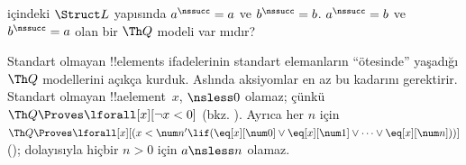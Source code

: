 \documentclass[../../../include/open-logic-section]{subfiles}
\begin{document}
\begin{prob}
 içindeki $\Struct L$ yapısında
$a^\nssucc=a$ ve $b^\nssucc=b$. $a^\nssucc=b$ ve $b^\nssucc=a$ olan
bir $\Th Q$ modeli var mıdır?
\end{prob}

\begin{explain}
Standart olmayan !!{element}s ifadelerinin standart elemanların
``ötesinde'' yaşadığı $\Th Q$ modellerini açıkça kurduk. Aslında
aksiyomlar en az bu kadarını gerektirir. Standart olmayan
!!a{element}~$x$, ${}\nsless0$ olamaz; çünkü
$\Th Q\Proves\lforall[x][\lnot x<0]$
(bkz. ). Ayrıca her $n$ için
$\Th Q\Proves\lforall[x][(x<\num n'\lif
(\eq[x][\num0]\lor\eq[x][\num1]\lor\dots\lor\eq[x][\num n]))]$
(); dolayısıyla hiçbir $n>0$ için
$a\nsless n$ olamaz.
\end{explain}
\end{document}

